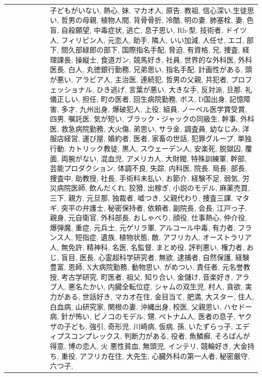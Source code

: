 \documentclass[a4j,12pt]{jsreport}
\begin{document}
  
\setlongtables
\begin{tabularx}{\textwidth}{l|X}
   　　　　　&  子どもがいない, 熱心, 妹, マカオ人, 原告, 教祖, 信心深い,生徒思い, 哲男の母親, 植物人間, 背骨骨折, 冷酷, 明の妻, 肺塞栓, 妻, 色盲, 自殺願望, 中毒症状, 逃亡, 息子思い, Rh-型, 技術者, ドイツ人, フィリピン人, 元恋人, 助手, 隣人, いい加減, 人任せ, エゴ, 部下, 間久部緑郎の部下, 国際指名手配, 脅迫, 有資格, 兄, 捜査, 経理課長, 操縦士, 食道ガン, 競馬好き, 社員, 世界的な外科医, 外科医長, 白人, 丸徳銀行勤務, 兄弟思い, 指名手配, 計画性がある, 頭が悪い, アラビア人, 主治医, 連続犯, 哲男の父親, 共犯者, プロフェッショナル, ひき逃げ, 言葉が悪い, 大きな手, 反対派, 旦那, 礼儀正しい, 担任, 町の医者, 回生病院勤務, ボス, D国出身, 記憶障害, 多才, 九州出身, 爆破犯人, 上役, 組員, ノーベル医学賞受賞, 四男, 嘱託医, 気が短い, ブラック・ジャックの同級生, 幹事, 外科医, 救急病院勤務, 大火傷, 弟思い, サラ金, 調査員, 幼なじみ, 洋服店経営, 運び屋, 婚約者, 医者, 家畜の世話, 犯罪グループ, 単独行動, カトリック教徒, 黒人, スウェーデン人, 安楽死, 脱獄囚, 覆面, 両腕がない, 混血児, アメリカ人, 大財閥, 特殊訓練軍, 幹部, 芸能プロダクション, 体調不良, 失踪, 内科医, 院長, 局長, 部長, 捜査中, 助教授, 社長, 手術料未払い, お節介, 経験不足, 弱気, 労災病院医師, 飲んだくれ, 狡猾, 出稼ぎ, 小説のモデル, 麻薬売買, 三下, 親方, 元旦那, 独裁者, 嘘つき, 父親代わり, 捜査三課, マタギ, 突平の弁護士, 秘密保持者, 依頼者, 副院長, 会長, 江戸っ子, 親身, 元自衛官, 外科部長, おしゃべり, 顔役, 仕事熱心, 仲介役, 爆弾魔, 重症, 元兵士, 元ゲリラ軍, アルコール中毒, 有力者, フランス人, 短指症, 遺族, 植物状態, 敵, アフリカ人, オーストラリア人, 無免許, 精神科, 名医, 名監督, まとめ役, 評判悪い, 権力者, おじ, 盲目, 医長, 心霊超科学研究者, 無欲, 逮捕者, 自然保護, 経験豊富, 恩師, X大病院勤務, 動物思い, がめつい, 責任者, 元名誉教授, 考古学研究, 町医者, 祖父, 知り合い, 金儲け, 音楽好き, アラブ人, 悪名たかい, 内臓全転位症, シャムの双生児, 村人, 貪欲, 実力がある, 世話好き, マカオ在住, 金目当て, 肥満, 大スター, 住人, 白血病, 山研究家, 関根の妻, 沖縄出身, 校医, 父親思い, ハセドー病, 針が怖い, ピノコのモデル, 甥, ベトナム人, 医者の息子, ヤクザの子ども, 強引, 奇形児, 川崎病, 仮病, 孫, いたずらっ子, エディプスコンプレックス, 判断力がある, 役者, 魚鱗癬, そろばんが得意, 博の恋人, 火 悪性貧血, 無頭児, インテリ, 競輪好き, 大金持ち, 重役, アフリカ在住, 大先生, 心臓外科の第一人者, 秘密厳守,  六つ子,\\
\end{tabularx} 
\end{document}
